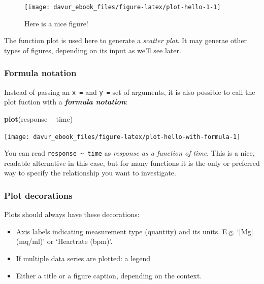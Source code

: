 \documentclass[]{book}
\newenvironment{Shaded}{\begin{snugshade}}{\end{snugshade}}
\newcommand{\KeywordTok}[1]{\textcolor[rgb]{0.13,0.29,0.53}{\textbf{#1}}}
\newcommand{\NormalTok}[1]{#1}
\newcommand{\OperatorTok}[1]{\textcolor[rgb]{0.81,0.36,0.00}{\textbf{#1}}}
\newcommand{\StringTok}[1]{\textcolor[rgb]{0.31,0.60,0.02}{#1}}
\providecommand{\tightlist}{%
  \setlength{\itemsep}{0pt}\setlength{\parskip}{0pt}}
\begin{document}
\begin{figure}

{\centering \texttt{[image: davur\_ebook\_files/figure-latex/plot-hello-1-1]} 

}

\caption{Here is a nice figure!}\label{fig:plot-hello-1}
\end{figure}

The function plot is used here to generate a \emph{scatter plot}. It may generae other types of figures, depending on its input as we'll see later.

\hypertarget{formula-notation}{%
\subsubsection*{Formula notation}\label{formula-notation}}

Instead of passing an \texttt{x\ =} and \texttt{y\ =} set of arguments, it is also possible to call the plot fuction with a \textbf{\emph{formula notation}}:

\begin{Shaded}
\begin{Highlighting}[]
\KeywordTok{plot}\NormalTok{(response }\OperatorTok{~}\StringTok{ }\NormalTok{time)}
\end{Highlighting}
\end{Shaded}

\begin{center}\texttt{[image: davur\_ebook\_files/figure-latex/plot-hello-with-formula-1]} \end{center}

You can read \texttt{response\ \textasciitilde{}\ time} as \emph{response as a function of time}. This is a nice, readable alternative in this case, but for many functions it is the only or preferred way to specify the relationship you want to investigate.

\hypertarget{plot-decorations}{%
\subsubsection*{Plot decorations}\label{plot-decorations}}

Plots should always have these decorations:

\begin{itemize}
\tightlist
\item
  Axis labels indicating measurement type (quantity) and its units. E.g. `{[}Mg{]} (mq/ml)' or `Heartrate (bpm)'.
\item
  If multiple data series are plotted: a legend
\item
  Either a title or a figure caption, depending on the context.
\end{itemize}
\end{document}
